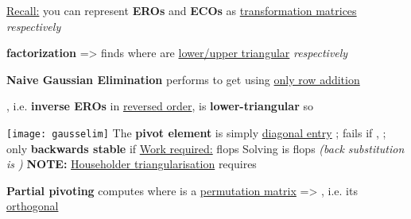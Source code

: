 \ul{Recall:} you can represent \textbf{EROs} and
\textbf{ECOs} as \ul{transformation matrices} 
\emph{respectively}

\textbf{ factorization} => finds 
where  are \ul{lower/upper triangular} \emph{respectively}

\hSep %

\textbf{Naive Gaussian Elimination} performs
\iMbox{ [I_{m} \ | \ A \ | \ I_{n}] \rightsquigarrow [R^{-1} \ | \ U \ | \ I_{n}]}
to get  using \ul{only row addition}
\begin{itemize}
      \vItem
            , i.e. \textbf{inverse EROs} in \ul{reversed order}, is
            \textbf{lower-triangular} so 

            \texttt{[image: gausselim]}
      \vItem
            The \textbf{pivot element} is simply \ul{diagonal entry}
            ; fails if
      \vItem
            ,
            ;
            only \textbf{backwards stable} if
      \vItem
            \ul{Work required:}  flops
      \vItem
            Solving  is  flops
            \emph{(back substitution is )}
      \vItem
            \textbf{NOTE:} \ul{Householder triangularisation} requires
\end{itemize}

\hSep %

\textbf{Partial pivoting} computes  where  is
a \ul{permutation matrix} => , i.e. its \ul{orthogonal}

